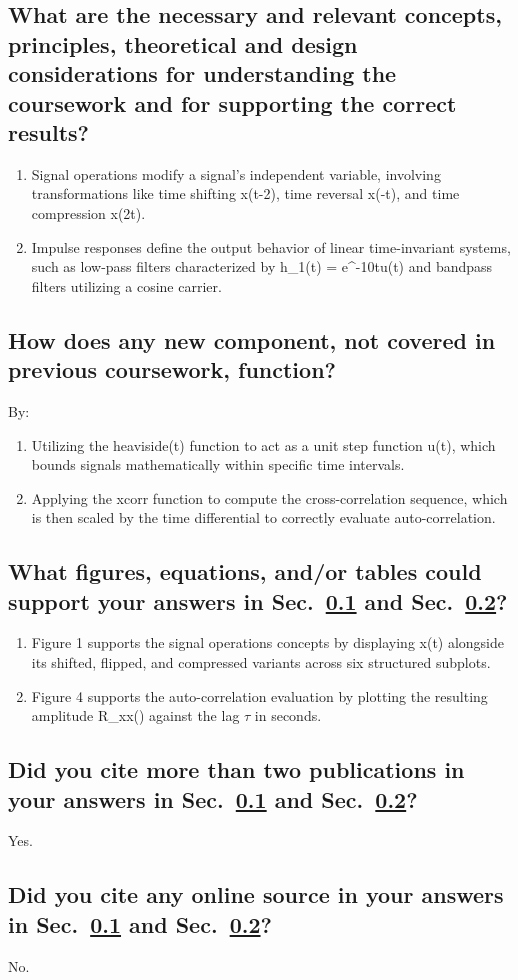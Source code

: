\subsection{What are the necessary and relevant concepts, principles, theoretical and design considerations for understanding the coursework and for supporting the correct results?}
\label{sec:nrcp}
\begin{enumerate}
\item Signal operations modify a signal's independent variable, involving transformations like time shifting x(t-2), time reversal x(-t), and time compression x(2t).
\item  Impulse responses define the output behavior of linear time-invariant systems, such as low-pass filters characterized by h_{1}(t) = e^{-10t}u(t) and bandpass filters utilizing a cosine carrier.
\end{enumerate}

\subsection{How does any new component, not covered in previous coursework, function?}
\label{sec:nfxn}
By:
\begin{enumerate}
\item Utilizing the heaviside(t) function to act as a unit step function u(t), which bounds signals mathematically within specific time intervals.
\item Applying the xcorr function to compute the cross-correlation sequence, which is then scaled by the time differential to correctly evaluate auto-correlation.
\end{enumerate}
	
\subsection{What figures, equations, and/or tables could support your answers in Sec.~\ref{sec:nrcp} and Sec.~\ref{sec:nfxn}?}
\begin{enumerate}
\item Figure 1 supports the signal operations concepts by displaying x(t) alongside its shifted, flipped, and compressed variants across six structured subplots.
\item Figure 4 supports the auto-correlation evaluation by plotting the resulting amplitude R_{xx}(\tau) against the lag $\tau$ in seconds.
\end{enumerate}
	
\subsection{Did you cite more than two publications in your answers in Sec.~\ref{sec:nrcp} and Sec.~\ref{sec:nfxn}?}
Yes.
\subsection{Did you cite any online source in your answers in Sec.~\ref{sec:nrcp} and Sec.~\ref{sec:nfxn}?}
No.